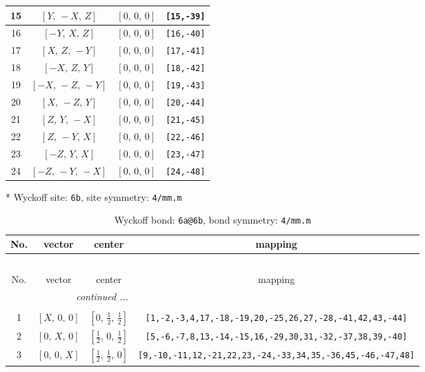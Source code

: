 \documentclass[fleqn,8pt]{jsarticle}
\begin{document}
\begin{longtable}{cccc}
15 & $\left[ Y,\, - X,\, Z \right]$ & $\left[ 0,\, 0,\, 0 \right]$ & {\tt [15,-39]} \\ \hline
16 & $\left[ - Y,\, X,\, Z \right]$ & $\left[ 0,\, 0,\, 0 \right]$ & {\tt [16,-40]} \\ \hline
17 & $\left[ X,\, Z,\, - Y \right]$ & $\left[ 0,\, 0,\, 0 \right]$ & {\tt [17,-41]} \\ \hline
18 & $\left[ - X,\, Z,\, Y \right]$ & $\left[ 0,\, 0,\, 0 \right]$ & {\tt [18,-42]} \\ \hline
19 & $\left[ - X,\, - Z,\, - Y \right]$ & $\left[ 0,\, 0,\, 0 \right]$ & {\tt [19,-43]} \\ \hline
20 & $\left[ X,\, - Z,\, Y \right]$ & $\left[ 0,\, 0,\, 0 \right]$ & {\tt [20,-44]} \\ \hline
21 & $\left[ Z,\, Y,\, - X \right]$ & $\left[ 0,\, 0,\, 0 \right]$ & {\tt [21,-45]} \\ \hline
22 & $\left[ Z,\, - Y,\, X \right]$ & $\left[ 0,\, 0,\, 0 \right]$ & {\tt [22,-46]} \\ \hline
23 & $\left[ - Z,\, Y,\, X \right]$ & $\left[ 0,\, 0,\, 0 \right]$ & {\tt [23,-47]} \\ \hline
24 & $\left[ - Z,\, - Y,\, - X \right]$ & $\left[ 0,\, 0,\, 0 \right]$ & {\tt [24,-48]} \\
\end{longtable}
* Wyckoff site: {\tt 6b}, site symmetry: {\tt 4/mm.m}
\renewcommand{\arraystretch}{1.2}
\begin{longtable}{cccc}
\caption{Wyckoff bond: {\tt 6a@6b}, bond symmetry: {\tt 4/mm.m}}
 \\
 \hline \hline
No. & vector & center & mapping \\ \hline \endfirsthead

\multicolumn{3}{l}{\tablename\ \thetable{}} \\
 \hline \hline
No. & vector & center & mapping \\ \hline \endhead

 \hline \hline
\multicolumn{3}{r}{\footnotesize\it continued ...} \\ \endfoot

 \hline \hline
\multicolumn{3}{r}{} \\ \endlastfoot

1 & $\left[ X,\, 0,\, 0 \right]$ & $\left[ 0,\, \frac{1}{2},\, \frac{1}{2} \right]$ & {\tt [1,-2,-3,4,17,-18,-19,20,-25,26,27,-28,-41,42,43,-44]} \\ \hline
2 & $\left[ 0,\, X,\, 0 \right]$ & $\left[ \frac{1}{2},\, 0,\, \frac{1}{2} \right]$ & {\tt [5,-6,-7,8,13,-14,-15,16,-29,30,31,-32,-37,38,39,-40]} \\ \hline
3 & $\left[ 0,\, 0,\, X \right]$ & $\left[ \frac{1}{2},\, \frac{1}{2},\, 0 \right]$ & {\tt [9,-10,-11,12,-21,22,23,-24,-33,34,35,-36,45,-46,-47,48]} \\
\end{longtable}
\end{document}
